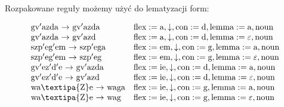 \documentclass{beamer}
\begin{document}
\begin{frame}
\begin{scriptsize}
\[\begin{array}{ll}
\end{array}
\]\end{scriptsize}
Rozpakowane reguły możemy użyć do lematyzacji form:
\begin{scriptsize}\[
\begin{array}{ll}
\text{gv$'$azda $\rightarrow$ gv$'$azda} & \text{flex}:=\text{a}, \downarrow, \text{con}:=\text{d}, \text{lemma}:=\text{a}, \text{noun}\\
\text{gv$'$azda $\rightarrow$ gv$'$azd} & \text{flex}:=\text{a}, \downarrow, \text{con}:=\text{d}, \text{lemma}:=\text{$\varepsilon$}, \text{noun}\\
\text{szp$'$eg$'$em $\rightarrow$ szp$'$ega} & \text{flex}:=\text{em}, \downarrow, \text{con}:=\text{g}, \text{lemma}:=\text{a}, \text{noun}\\
\text{szp$'$eg$'$em $\rightarrow$ szp$'$eg} & \text{flex}:=\text{em}, \downarrow, \text{con}:=\text{g}, \text{lemma}:=\text{$\varepsilon$}, \text{noun}\\
\text{gv$'$ez$'$d$'$e $\rightarrow$ gv$'$azda} & \text{flex}:=\text{ie}, \downarrow, \text{con}:=\text{d}, \text{lemma}:=\text{a}, \text{noun}\\
\text{gv$'$ez$'$d$'$e $\rightarrow$ gv$'$azd} & \text{flex}:=\text{ie}, \downarrow, \text{con}:=\text{d}, \text{lemma}:=\text{$\varepsilon$}, \text{noun}\\
\text{wa\textipa{Z}e $\rightarrow$ waga} & \text{flex}:=\text{ie}, \downarrow, \text{con}:=\text{g}, \text{lemma}:=\text{a}, \text{noun}\\
\text{wa\textipa{Z}e $\rightarrow$ wag} & \text{flex}:=\text{ie}, \downarrow, \text{con}:=\text{g}, \text{lemma}:=\text{$\varepsilon$}, \text{noun}\\
\end{array}
\]\end{scriptsize}

\end{frame}
\end{document}
